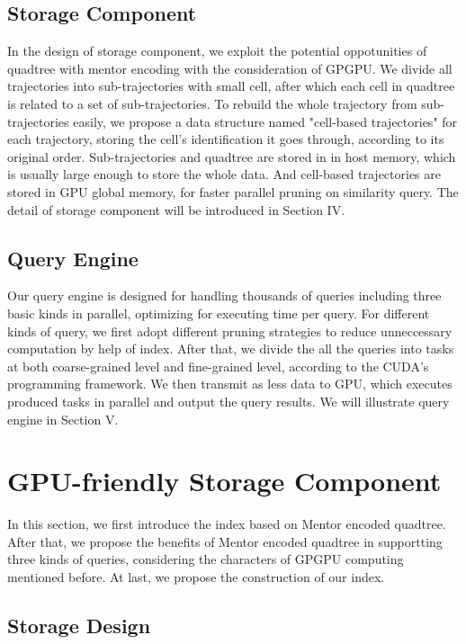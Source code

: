 \documentclass[conference]{IEEEtran}
\begin{document}
\subsection{Storage Component}
In the design of storage component, we exploit the potential oppotunities of quadtree with mentor encoding\cite{DBLP:conf/gis/LettichOS15} with the consideration of GPGPU. We divide all trajectories into sub-trajectories with small cell, after which each cell in quadtree is related to a set of sub-trajectories. To rebuild the whole trajectory from sub-trajectories easily, we propose a data structure named "cell-based trajectories" for each trajectory, storing the cell's identification it goes through, according to its original order. Sub-trajectories and quadtree are stored in in host memory, which is usually large enough to store the whole data. And cell-based trajectories are stored in GPU global memory, for faster parallel pruning on similarity query. The detail of storage component will be introduced in Section IV.

\subsection{Query Engine}
Our query engine is designed for handling thousands of queries including three basic kinds in parallel, optimizing for executing time per query. For different kinds of query, we first adopt different pruning strategies to reduce unneccessary computation by help of index. After that, we divide the all the queries into tasks at both coarse-grained level and fine-grained level, according to the CUDA's programming framework. We then transmit as less data to GPU, which executes produced tasks in parallel and output the query results. We will illustrate query engine in Section V.

\section{GPU-friendly Storage Component}
In this section, we first introduce the index based on Mentor encoded quadtree. After that, we propose the benefits of Mentor encoded quadtree in supportting three kinds of queries, considering the characters of GPGPU computing mentioned before. At last, we propose the construction of our index.

\subsection{Storage Design}
\end{document}
